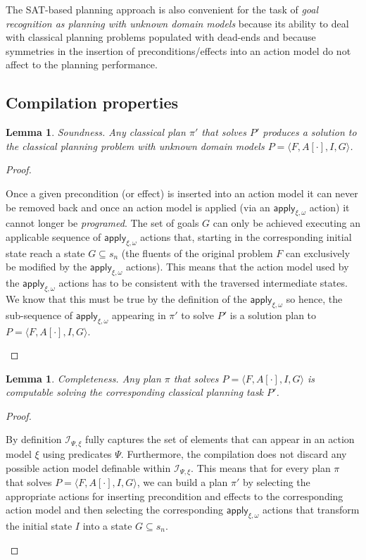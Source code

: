 \documentclass[letterpaper]{article} %
\newcommand{\tup}[1]{{\langle #1 \rangle}}
\newtheorem{mylemma}[mytheorem]{Lemma}
\begin{document}
The SAT-based planning approach is also convenient for the task of {\em goal recognition as planning with unknown domain models} because its ability to deal with classical planning problems populated with dead-ends and because symmetries in the insertion of preconditions/effects into an action model do not affect to the planning performance. 

\subsection{Compilation properties}
\begin{mylemma}
Soundness. Any classical plan $\pi'$ that solves $P'$ produces a solution to the classical planning problem with unknown domain models $P=\tup{F,A[\cdot],I,G}$.
\end{mylemma}

\begin{proof}[Proof]
\begin{small}
Once a given precondition (or effect) is inserted into an action model it can never be removed back and once an action model is applied (via an $\mathsf{apply_{\xi,\omega}}$ action) it cannot longer be {\em programed}. The set of goals $G$ can only be achieved executing an applicable sequence of $\mathsf{apply_{\xi,\omega}}$ actions that, starting in the corresponding initial state reach a state $G \subseteq s_n$ (the fluents of the original problem $F$ can exclusively be modified by the $\mathsf{apply_{\xi,\omega}}$ actions). This means that the action model used by the $\mathsf{apply_{\xi,\omega}}$ actions has to be consistent with the traversed intermediate states. We know that this must be true by the definition of the $\mathsf{apply_{\xi,\omega}}$ so hence, the sub-sequence of $\mathsf{apply_{\xi,\omega}}$ appearing in $\pi'$ to solve $P'$ is a solution plan to $P=\tup{F,A[\cdot],I,G}$. 
\end{small}
\end{proof}

\begin{mylemma}
Completeness. Any plan $\pi$ that solves $P=\tup{F,A[\cdot],I,G}$ is computable solving the corresponding classical planning task $P'$.
\end{mylemma}

\begin{proof}[Proof]
\begin{small}
By definition ${\mathcal I}_{\Psi,\xi}$ fully captures the set of elements that can appear in an action model $\xi$ using predicates $\Psi$. Furthermore, the compilation does not discard any possible action model definable within ${\mathcal I}_{\Psi,\xi}$. This means that for every plan $\pi$ that solves $P=\tup{F,A[\cdot],I,G}$, we can build a plan $\pi'$ by selecting the appropriate actions for inserting precondition and effects to the corresponding action model and then selecting the corresponding $\mathsf{apply_{\xi,\omega}}$ actions that transform the initial state $I$ into a state $G \subseteq s_n$.
\end{small}
\end{proof}
\end{document}
